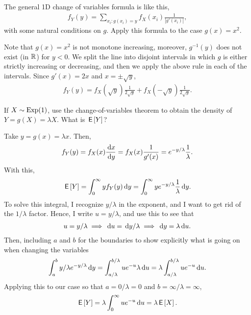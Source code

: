 \begin{exercise}
The general 1D change of variables formula is like this,
\begin{align*}
f_{Y}(y) = \sum_{x_{i}: g(x_{i})=y}f_{X}(x_{i})\frac 1{|g'(x_{i})|},
\end{align*}
with some natural conditions on $g$.
Apply this formula to the case $g(x)= x^{2}$.
\begin{solution}
Note that $g(x)=x^2$ is not monotone increasing, moreover, $g^{-1}(y)$  does not exist (in $\mathbb{R}$) for $y< 0$.
We  split the line into disjoint intervals in which $g$ is either strictly increasing or decreasing, and then we apply the above rule in each of the intervals. Since  $g'(x)= 2x$ and $x=\pm \sqrt y$,
\begin{align*}
f_{Y}(y) = f_{X}(\sqrt{y})\frac 1{2\sqrt y} + f_{X}(-\sqrt{y})\frac 1{2\sqrt y}.
\end{align*}
\end{solution}
\end{exercise}

\begin{exercise} If $X\sim \mathrm{Exp}(1)$,  use  the change-of-variables theorem to obtain the density of $Y=g(X)=\lambda X$. What is $\,\mathsf{E}\left[Y\right]$?
\begin{solution}
Take $y= g(x)= \lambda x$. Then,
\begin{align*}
f_{Y}(y) = f_X(x)\frac{\,\textrm{d}x}{\,\textrm{d}y} = f_{X}(x) \frac{1}{g'(x)} = e^{-y/\lambda} \frac 1 \lambda.
\end{align*}
With this,
\begin{align*}
\,\mathsf{E}\left[Y\right] = \int_0^{\infty} y f_Y(y) \,\textrm{d}y = \int_0^{\infty} y e^{-y/\lambda} \frac 1 \lambda  \,\textrm{d}y.
\end{align*}
To solve this integral, I recognize $y/\lambda$ in the exponent, and I want to get rid of the $1/\lambda$ factor. Hence, I write $u=y/\lambda$, and use this to see that
\begin{align*}
u = y/\lambda \implies \,\textrm{d}u = \,\textrm{d}y /\lambda \implies \,\textrm{d}y = \lambda \,\textrm{d}u.
\end{align*}
Then, including $a$ and $b$ for the boundaries to show explicitly what is going on when changing the variables
\begin{align*}
\int_{a}^b y/\lambda e^{-y/\lambda} \,\textrm{d}y =
\int_{a/\lambda }^{b/\lambda } u e^{-u} \lambda \,\textrm{d}u = \lambda \int_{a/\lambda }^{b/\lambda } u e^{-u}  \,\textrm{d}u.
\end{align*}
Applying this to our case so that $a = 0/\lambda = 0$ and $b = \infty/\lambda = \infty$,
\begin{align*}
\,\mathsf{E}\left[Y\right] = \lambda \int_{0 }^{\infty } u e^{-u}  \,\textrm{d}u = \lambda \,\mathsf{E}\left[X\right].
\end{align*}
\end{solution}
\end{exercise}

